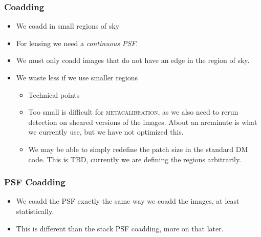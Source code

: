 \documentclass{beamer}
\newcommand{\mcal}{\textsc{metacalibration}}
\begin{document}
\frame
{

    \frametitle{Coadding}


    \begin{itemize}

        \item We coadd in small regions of sky
        \item For lensing we need a {\em continuous PSF}.
        \item We must only coadd images that do not have an edge in the region of sky.
        \item We waste less if we use smaller regions

            \begin{itemize}

                \item Technical points

                \item Too small is difficult for \mcal, as we also need to
                    rerun detection on sheared versions of the images. About an
                    arcminute is what we currently use, but we have not
                    optimized this.

                \item We may be able to simply redefine the patch size in the standard
                    DM code. This is TBD, currently we are defining the regions arbitrarily.

            \end{itemize}

    \end{itemize}

}

\frame
{

    \frametitle{PSF Coadding}

    \begin{itemize}

        \item We coadd the PSF exactly the same way we coadd the images, at
            least statistically.

        \item This is different than the stack PSF coadding, more on that later.

    \end{itemize}

}
\end{document}

